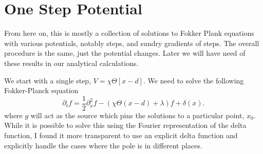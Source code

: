 

\section{One Step Potential }

From here on, this is mostly a collection of solutions to Fokker Plank equations with various potentials, notably steps, and sundry gradients of steps.  The overall procedure is the same, just the potential changes.  Later we will have need of these results in our analytical calculations.  

We start with a single step, $V = \chi\Theta[x-d]$.  We need to solve the following Fokker-Planck equation 
\begin{equation}
\partial_t f = \frac{1}{2}\partial_x^2 f - (\chi\Theta(x-d)+\lambda)f + \delta(x).
\end{equation}
where $g$ will act as the source which pins the solutions to a particular point, $x_0$.  While it is possible to solve this using the Fourier representation of the delta function, I found it more transparent to use an explicit delta function and explicitly handle the cases where the pole is in different places.  

